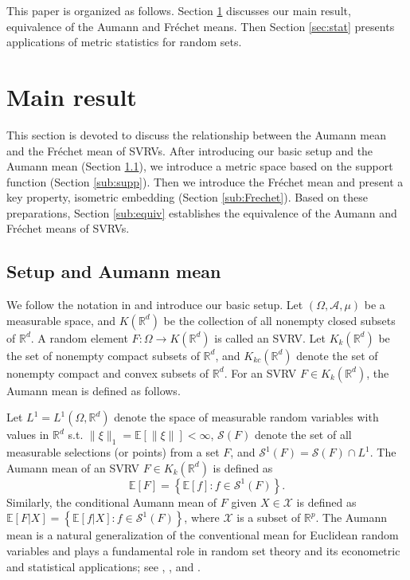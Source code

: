 \documentclass[11pt,reqno]{amsart}
\begin{document}
This paper is organized as follows. Section \ref{sec:main} discusses our main result, equivalence of the Aumann and Fr\'echet means. Then Section \ref{sec:stat} presents applications of metric statistics for random sets.

\section{Main result}\label{sec:main}

This section is devoted to discuss the relationship between the Aumann mean and the Fr\'echet mean of SVRVs. After introducing our basic setup and the Aumann mean (Section \ref{sub:Aumann}), we introduce a metric space based on the support function (Section \ref{sub:supp}). Then we introduce the Fr\'echet mean and present a key property, isometric embedding (Section \ref{sub:Frechet}). Based on these preparations, Section \ref{sub:equiv} establishes the equivalence of the Aumann and Fr\'echet means of SVRVs.

\subsection{Setup and Aumann mean}\label{sub:Aumann}

We follow the notation in \cite{BeMo08} and introduce our basic setup. Let $(\Omega, \mathcal{A}, \mu)$ be a measurable space, and $K(\mathbb{R}^d)$ be the collection of all nonempty closed subsets of $\mathbb{R}^d$. A random element $F:\Omega \to K(\mathbb{R}^d)$ is called an SVRV. Let $K_{k}(\mathbb{R}^d)$ be the set of nonempty compact subsets of $\mathbb{R}^d$, and $K_{kc}(\mathbb{R}^d)$ denote the set of nonempty compact and convex subsets of $\mathbb{R}^d$. For an SVRV $F \in K_k(\mathbb{R}^d)$, the Aumann mean is defined as follows.

Let $L^1=L^1(\Omega, \mathbb{R}^d)$ denote the space of measurable random variables with values in $\mathbb{R}^d$ s.t. $\|\xi\|_1 = \mathbb{E}[\|\xi\|]<\infty$, $\mathcal{S}(F)$ denote the set of all measurable selections (or points) from a set $F$, and $\mathcal{S}^1(F) = \mathcal{S}(F) \cap L^1$. The Aumann mean of an SVRV $F \in K_k(\mathbb{R}^d)$ is defined as
\begin{equation}
\mathbb{E}[F] = \left\{ \mathbb{E}[f]: f \in \mathcal{S}^1(F)\right\}.
\end{equation}
Similarly, the conditional Aumann mean of $F$ given $X \in \mathcal{X}$ is defined as $\mathbb{E}[F|X] = \left\{\mathbb{E}[f|X]: f \in \mathcal{S}^1(F)\right\}$, where $\mathcal{X}$ is a subset of $\mathbb{R}^p$. The Aumann mean is a natural generalization of the conventional mean for Euclidean random variables and plays a fundamental role in random set theory and its econometric and statistical applications; see \cite{Mo17}, \cite{MoMo18}, and \cite{Mo20}.
\end{document}

